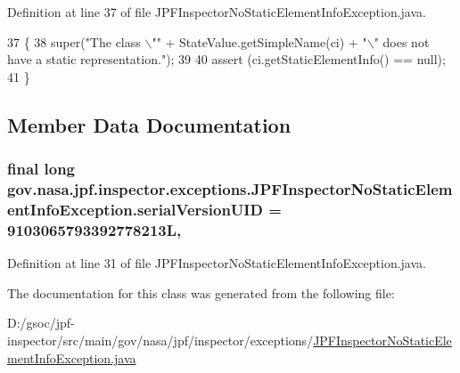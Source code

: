Definition at line 37 of file J\+P\+F\+Inspector\+No\+Static\+Element\+Info\+Exception.\+java.


\begin{DoxyCode}
37                                                                  \{
38     super(\textcolor{stringliteral}{"The class \(\backslash\)""} + StateValue.getSimpleName(ci) + \textcolor{stringliteral}{"\(\backslash\)" does not have a static representation."});
39 
40     assert (ci.getStaticElementInfo() == null);
41   \}
\end{DoxyCode}


\subsection{Member Data Documentation}
\subsubsection[{\texorpdfstring{serial\+Version\+U\+ID}{serialVersionUID}}]{\setlength{\rightskip}{0pt plus 5cm}final long gov.\+nasa.\+jpf.\+inspector.\+exceptions.\+J\+P\+F\+Inspector\+No\+Static\+Element\+Info\+Exception.\+serial\+Version\+U\+ID = 9103065793392778213L\hspace{0.3cm}{\ttfamily [static]}, {\ttfamily [private]}}\hypertarget{classgov_1_1nasa_1_1jpf_1_1inspector_1_1exceptions_1_1_j_p_f_inspector_no_static_element_info_exception_ace5b2e6da3aa341a2a411b8b59500246}{}\label{classgov_1_1nasa_1_1jpf_1_1inspector_1_1exceptions_1_1_j_p_f_inspector_no_static_element_info_exception_ace5b2e6da3aa341a2a411b8b59500246}


Definition at line 31 of file J\+P\+F\+Inspector\+No\+Static\+Element\+Info\+Exception.\+java.



The documentation for this class was generated from the following file\+:\begin{DoxyCompactItemize}
\item 
D\+:/gsoc/jpf-\/inspector/src/main/gov/nasa/jpf/inspector/exceptions/\hyperlink{_j_p_f_inspector_no_static_element_info_exception_8java}{J\+P\+F\+Inspector\+No\+Static\+Element\+Info\+Exception.\+java}\end{DoxyCompactItemize}
